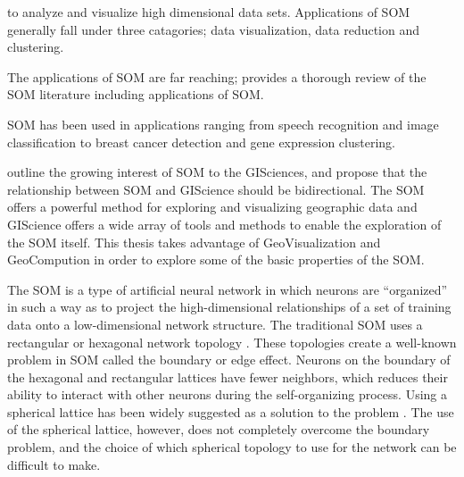 to analyze and visualize high dimensional data sets.  
Applications of SOM generally fall under three catagories; data visualization, data reduction and clustering.  



The applications of SOM are far reaching; \cite{Kohonen2000} provides a thorough review of the SOM literature including applications of SOM.  

SOM has been used in applications ranging from speech recognition and image classification to breast cancer detection and gene expression clustering.  

\cite{skupin08} outline the growing interest of SOM to
the GISciences, and propose that the relationship between SOM and GIScience
should be bidirectional.  The SOM offers a powerful method for exploring and
visualizing geographic data and GIScience offers a wide array of tools
and methods to enable the exploration of the SOM itself.  This thesis takes
advantage of GeoVisualization and GeoCompution in order to explore some of the basic
properties of the SOM.

The SOM is a type of artificial neural network in which neurons are ``organized''
in such a way as to project the high-dimensional relationships of a set of
training data onto a low-dimensional network structure.  The traditional
SOM uses a rectangular or hexagonal network topology \citep{Kohonen2000}.  These topologies 
create a well-known problem in SOM called the boundary or edge effect.  Neurons on
the boundary of the hexagonal and rectangular lattices have fewer neighbors,
which reduces their ability to interact with other neurons during the
self-organizing process.  Using a spherical lattice has been widely suggested as a
solution to the problem \citep{ritter99, boudjemai2003, sangole03,
Nishio:2006fk, wu2006}. The use of the spherical lattice, however, does not
completely overcome the boundary problem, and the choice of which spherical
topology to use for the network can be difficult to make.

